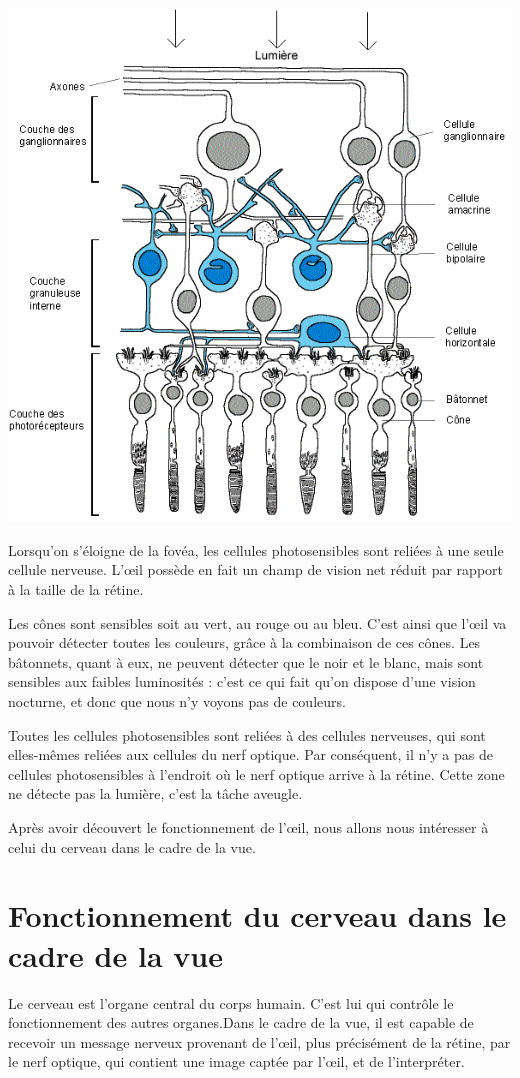 \documentclass[a4paper, 12pt, onecolumn, openany]{report}
\begin{document}
	\includegraphics[scale=0.5]{retine.png}
	
	Lorsqu’on s’éloigne de la fovéa, les cellules photosensibles sont reliées à une seule cellule nerveuse. L’œil possède en fait un champ de vision net réduit par rapport à la taille de la rétine.
	
	Les cônes sont sensibles soit au vert, au rouge ou au bleu. C’est ainsi que l’œil va pouvoir détecter toutes les couleurs, grâce à la combinaison de ces cônes. Les bâtonnets, quant à eux, ne peuvent détecter que le noir et le blanc, mais sont sensibles aux faibles luminosités : c’est ce qui fait qu’on dispose d’une vision nocturne, et donc que nous n’y voyons pas de couleurs.
	
	Toutes les cellules photosensibles sont reliées à des cellules nerveuses, qui sont elles-mêmes reliées aux cellules du nerf optique. Par conséquent, il n’y a pas de cellules photosensibles à l’endroit où le nerf optique arrive à la rétine. Cette zone ne détecte pas la lumière, c’est la tâche aveugle.
	
	Après avoir découvert le fonctionnement de l’œil, nous allons nous intéresser à celui du cerveau dans le cadre de la vue.

	\section{Fonctionnement du cerveau dans le cadre de la vue}
	Le cerveau est l’organe central du corps humain. C’est lui qui contrôle le fonctionnement des autres organes.Dans le cadre de la vue, il est capable de recevoir un message nerveux provenant de l’œil, plus précisément de la rétine, par le nerf optique, qui contient une image captée par l’œil, et de l’interpréter.
	
\end{document}
